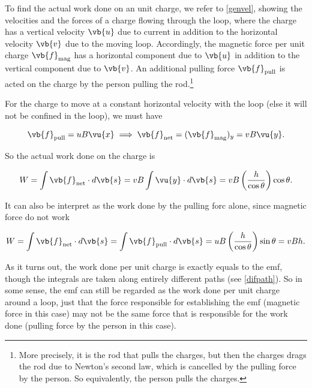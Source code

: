 \documentclass[english,a4paper,12pt]{report}
\begin{document}
To find the actual work done on an unit charge, we refer to \cref{genvel}, showing the velocities and the forces of a charge flowing through the loop, where the charge has a vertical velocity \(\vb{u}\) due to current in addition to the horizontal velocity \(\vb{v} \) due to the moving loop. Accordingly, the magnetic force per unit charge \(\vb{f} _{\text{mag} } \) has a horizontal component due to \(\vb{u}\) in addition to the vertical component due to \(\vb{v} \). An additional pulling force \(\vb{f} _{\text{pull} } \) is acted on the charge by the person pulling the rod.\footnote{More precisely, it is the rod that pulls the charges, but then the charges drags the rod due to Newton's second law, which is cancelled by the pulling force by the person. So equivalently, the person pulls the charges.}   



For the charge to move at a constant horizontal velocity with the loop (else it will not be confined in the loop), we must have 

\begin{equation}
    \vb{f} _{\text{pull} } = uB \vu{x} \implies \vb{f} _{\text{net} } = (\vb{f} _{\text{mag} })_{y} = vB \vu{y} . 
\end{equation}

So the actual work done on the charge is 

\begin{equation}
    W = \int \vb{f} _{\text{net} } \cdot d \vb{s} = vB \int \vu{y} \cdot d \vb{s} = vB\left( \frac{h}{\cos \theta }  \right)\cos \theta .
\end{equation}

It can also be interpret as the work done by the pulling forc alone, since magnetic force do not work

\begin{equation}
    W = \int \vb{f} _{\text{net} } \cdot d \vb{s} =  \int \vb{f} _{\text{pull} } \cdot  d \vb{s} =  uB \left( \frac{h}{\cos \theta }   \right) \sin \theta  = vBh.
\end{equation}

As it turns out, the work done per unit charge is exactly equals to the emf, though the integrals are taken along entirely different paths (see \cref{difpath}). So in some sense, the emf can still be regarded as the work done per unit charge around a loop, just that the force responsible for establishing the emf (magnetic force in this case) may not be the same force that is responsible for the work done (pulling force by the person in this case).
\end{document}
